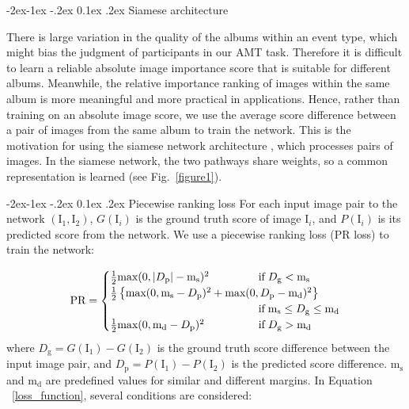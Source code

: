 \documentclass[10pt,twocolumn,letterpaper]{article}
\makeatletter
\renewcommand\subsubsection{\@startsection{subsubsection}{3}{\z@}%
                {-2ex\@plus -1ex \@minus -.2ex}%
                {0.1ex \@plus .2ex}%
                {\normalfont\normalsize\bfseries}}
\makeatother
\begin{document}
 \subsubsection{Siamese architecture} 

There is large variation in the quality of the albums within an event type, which might bias the judgment of participants in our AMT task. Therefore it is difficult to learn a reliable absolute image importance score that is suitable for different albums. Meanwhile, the relative importance ranking of images within the same album is more meaningful and more practical in applications. Hence, rather than training on an absolute image score, we use the average score difference between a pair of images from the same album to train the network. This is the motivation for using the siamese network architecture \cite{siamese}, which processes pairs of images. In the siamese network, the two pathways share weights, so a common representation is learned (see Fig.~\ref{figure1}).
 
\subsubsection{Piecewise ranking loss} 
For each input image pair to the network $(\text{I}_{1}, \text{I}_{2})$, $G(\text{I}_i)$ is the ground truth score of  image $\text{I}_i$, and $P(\text{I}_i)$ is its predicted score from the network. We use a piecewise ranking loss (PR loss) to train the network:

\begin{equation} 
  \text{PR} = \begin{cases}
 \frac{1}{2}\text{max}(0, \left | D_\text{p} \right |-\text{m}_\text{s})^{2} &\text{if}  \; D_\text{g} < \text{m}_\text{s}\\
\mathrlap{
\frac{1}{2}\left \{ \text{max}(0, \text{m}_\text{s}-D_\text{p})^{2}
+ \text{max}(0, D_\text{p}-\text{m}_\text{d})^{2} \right \}
} \\
 & \text{if} \;  \text{m}_\text{s} \leq D_\text{g}  \leq \text{m}_\text{d} \\
 \frac{1}{2}\text{max}(0, \text{m}_\text{d}-D_\text{p})^{2} \; \; \; \; \; \;  \; \;\; \;  \; \; \; \;   & \text{if}  \; D_\text{g}  > \text{m}_\text{d}
\end{cases}
\label{loss_function}
\end{equation}
\noindent
where  $D_\text{g} = G(\text{I}_{1})-G(\text{I}_{2})$ is the ground truth score difference between the input image pair, and  $D_\text{p} = P(\text{I}_{1})-P(\text{I}_{2})$ is the predicted score difference. $\text{m}_\text{s}$ and $\text{m}_\text{d}$ are predefined values for similar and different margins. In Equation ~\ref{loss_function}, several conditions are considered:
\end{document}
